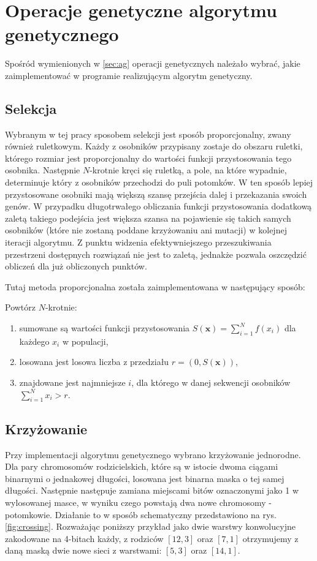 \section{Operacje genetyczne algorytmu genetycznego}\label{sec:genetic_ops}
Spośród wymienionych w \ref{sec:ag} operacji genetycznych należało wybrać, jakie zaimplementować w programie realizującym algorytm genetyczny.
\subsection{Selekcja}
Wybranym w tej pracy sposobem selekcji jest sposób proporcjonalny, zwany również ruletkowym.
Każdy z osobników przypisany zostaje do obszaru ruletki, którego rozmiar jest proporcjonalny do wartości funkcji przystosowania tego osobnika.
Następnie $N$-krotnie kręci się ruletką, a pole, na które wypadnie, determinuje który z osobników przechodzi do puli potomków.
W ten sposób lepiej przystosowane osobniki mają większą szansę przejścia dalej i przekazania swoich genów.
W przypadku długotrwałego obliczania funkcji przystosowania dodatkową zaletą takiego podejścia jest większa szansa na pojawienie się takich samych osobników (które nie zostaną poddane krzyżowaniu ani mutacji) w kolejnej iteracji algorytmu.
Z punktu widzenia efektywniejszego przeszukiwania przestrzeni dostępnych rozwiązań nie jest to zaletą, jednakże pozwala oszczędzić obliczeń dla już obliczonych punktów.

Tutaj metoda proporcjonalna została zaimplementowana w następujący sposób:

Powtórz $N$-krotnie:
\begin{enumerate}
  \item sumowane są wartości funkcji przystosowania $S(\mathbf{x})=\sum_{i=1}^{N}f(x_i)$ dla każdego $x_i$ w populacji,
  \item losowana jest losowa liczba z przedziału $r = (0,S(\mathbf{x}))$,
  \item znajdowane jest najmniejsze $i$, dla którego w danej sekwencji osobników $\sum_{i=1}^{N}x_i > r $.
\end{enumerate}

\subsection{Krzyżowanie}
Przy implementacji algorytmu genetycznego wybrano krzyżowanie jednorodne.
Dla pary chromosomów rodzicielskich, które są w istocie dwoma ciągami binarnymi o jednakowej długości, losowana jest binarna maska o tej samej długości.
Następnie następuje zamiana miejscami bitów oznaczonymi jako 1 w wylosowanej masce, w wyniku czego powstają dwa nowe chromosomy - potomkowie.
Działanie to w sposób schematyczny przedstawiono na rys. \ref{fig:crossing}.
Rozważając poniższy przykład jako dwie warstwy konwolucyjne zakodowane na 4-bitach każdy, z rodziców $[12,3]$ oraz $[7,1]$ otrzymujemy z daną maską dwie nowe sieci z warstwami: $[5,3]$ oraz $[14,1]$.

